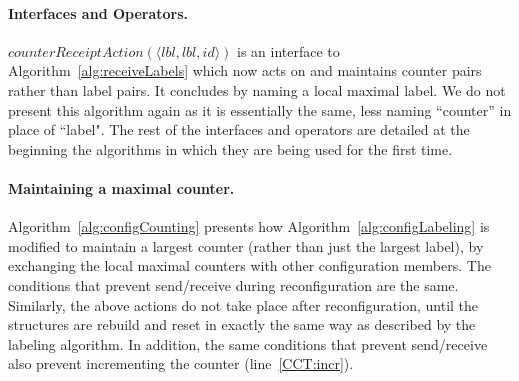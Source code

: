 \documentclass[11pt]{article}
\begin{document}
\paragraph{Interfaces and Operators.}
$counterReceiptAction(\langle lbl, lbl, id \rangle)$ is an interface to Algorithm~\ref{alg:receiveLabels} which now acts on and maintains counter pairs rather than label pairs.
It concludes by naming a local maximal label.
We do not present this algorithm again as it is essentially the same, less naming ``counter'' in place of ``label".
The rest of the interfaces and operators are detailed at the beginning the algorithms in which they are being used for the first time.


\paragraph{Maintaining a maximal counter.} Algorithm~\ref{alg:configCounting} presents how Algorithm~\ref{alg:configLabeling} is modified to maintain a largest counter (rather than just the largest label), by exchanging the local maximal counters with other configuration members.
The conditions that prevent send/receive during reconfiguration are the same.
Similarly, the above actions do not take place after reconfiguration, until the structures are rebuild and reset in exactly the same way as described by the labeling algorithm.
In addition, the same conditions that prevent send/receive also prevent incrementing the counter (line~\ref{CCT:incr}).
\end{document}
